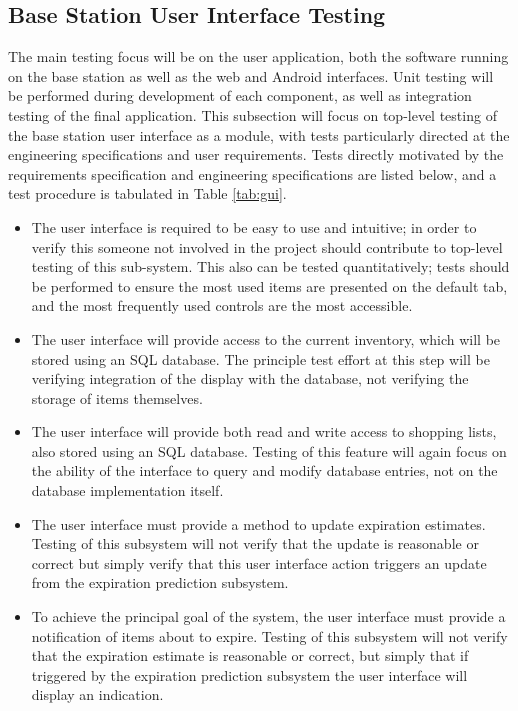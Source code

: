\documentclass[11pt]{article} %
\begin{document}
\subsection{Base Station User Interface Testing}
The main testing focus will be on the user application, both the software running on the base station as well as the web and Android interfaces.  Unit testing will be performed during development of each component, as well as integration testing of the final application. This subsection will focus on top-level testing of the base station user interface as a module, with tests particularly directed at the engineering specifications and user requirements. Tests directly motivated by the requirements specification and engineering specifications are listed below, and a test procedure is tabulated in Table \ref{tab:gui}.
\begin{itemize}
\item The user interface is required to be easy to use and intuitive; in order to verify this someone not involved in the project should contribute to top-level testing of this sub-system. This also can be tested quantitatively; tests should be performed to ensure the most used items are presented on the default tab, and the most frequently used controls are the most accessible.
\item The user interface will provide access to the current inventory, which will be stored using an SQL database. The principle test effort at this step will be verifying integration of the display with the database, not verifying the storage of items themselves.
\item The user interface will provide both read and write access to shopping lists, also stored using an SQL database. Testing of this feature will again focus on the ability of the interface to query and modify database entries, not on the database implementation itself.
\item The user interface must provide a method to update expiration estimates. Testing of this subsystem will not verify that the update is reasonable or correct but simply verify that this user interface action triggers an update from the expiration prediction subsystem.
\item To achieve the principal goal of the system, the user interface must provide a notification of items about to expire. Testing of this subsystem will not verify that the expiration estimate is reasonable or correct, but simply that if triggered by the expiration prediction subsystem the user interface will display an indication.
\end{itemize}
\end{document}
